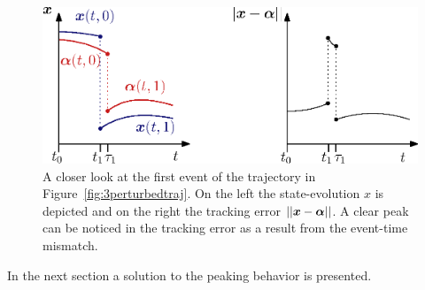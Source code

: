 \documentclass[../DC2017114Bouma.tex]{subfiles}
\begin{document}
\begin{figure}[h]
\centering
\includegraphics[width=.66\textwidth]{peakerror.eps}\caption{A closer look at the first event of the trajectory in Figure~\ref{fig:3perturbedtraj}. On the left the state-evolution $x$ is depicted and on the right the tracking error $||{\boldsymbol{x}}-\boldsymbol{\alpha}||$. A clear peak can be noticed in the tracking error as a result from the event-time mismatch.} \label{fig:3peakerror}
\end{figure}

In the next section a solution to the peaking behavior is presented.
%
%
%
%
%
\end{document}

